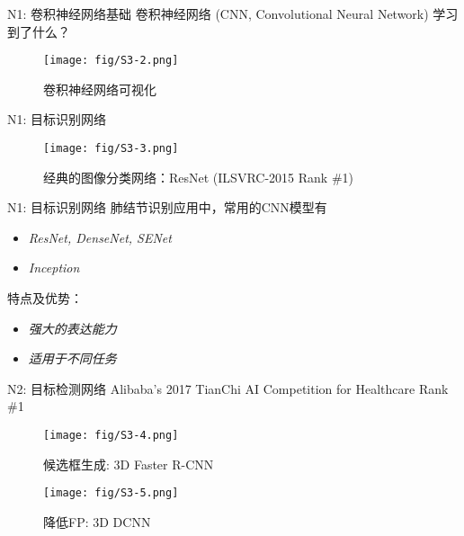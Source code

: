 \documentclass[10pt]{beamer}
\begin{document}
\begin{frame}{N1: 卷积神经网络基础}
  卷积神经网络 (CNN, Convolutional Neural Network) 学习到了什么？
  \begin{figure}[H]
    \centering
    \texttt{[image: fig/S3-2.png]}
    \caption{卷积神经网络可视化}
  \end{figure}
\end{frame}

\begin{frame}{N1: 目标识别网络}
  \begin{figure}[H]
    \centering
    \texttt{[image: fig/S3-3.png]}
    \caption{经典的图像分类网络：ResNet (ILSVRC-2015 Rank \#1)}
  \end{figure}
\end{frame}

\begin{frame}{N1: 目标识别网络}
  肺结节识别应用中，常用的CNN模型有
  \begin{itemize}
    \item \textit{ResNet, DenseNet, SENet}
    \item \textit{Inception}
  \end{itemize}

  特点及优势：
  \begin{itemize}
    \item \textit{强大的表达能力}
    \item \textit{适用于不同任务}
  \end{itemize}
\end{frame}

\begin{frame}{N2: 目标检测网络}
  Alibaba’s 2017 TianChi AI Competition for Healthcare Rank \#1

  \begin{figure}[H]
    \centering
    \texttt{[image: fig/S3-4.png]}
    \caption{候选框生成: 3D Faster R-CNN}
  \end{figure}
  \begin{figure}[H]
    \centering
    \texttt{[image: fig/S3-5.png]}
    \caption{降低FP: 3D DCNN}
  \end{figure}
\end{frame}
\end{document}
